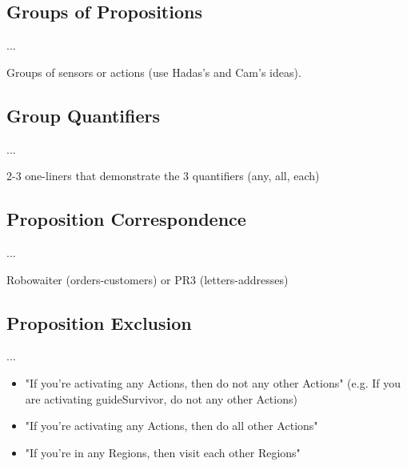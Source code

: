 \subsection{Groups of Propositions} 

...

\begin{myExample}\label{Ex:groups}
	Groups of sensors or actions (use Hadas's and Cam's ideas).
\end{myExample}

\subsection{Group Quantifiers} 

...

\begin{myExample}\label{Ex:quantifiers}
	2-3 one-liners that demonstrate the 3 quantifiers (any, all, each)
\end{myExample}

\subsection{Proposition Correspondence} 

...

\begin{myExample}\label{Ex:corresponding}
	Robowaiter (orders-customers) or PR3 (letters-addresses)
\end{myExample}

\subsection{Proposition Exclusion} 

...

\begin{myExample}\label{Ex:other}
	\begin{itemize}
		\item "If you're activating any Actions, then do not any other Actions" (e.g. If you are activating 			guideSurvivor, do not any other Actions)
		\item "If you're activating any Actions, then do all other Actions"
		\item "If you're in any Regions, then visit each other Regions"
	\end{itemize}
\end{myExample}